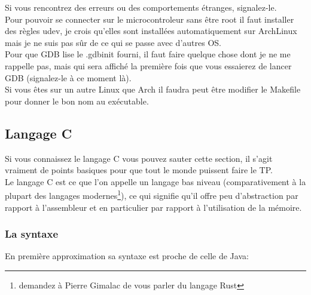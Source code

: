 \documentclass[a4paper,10pt]{article} %
\begin{document}
Si vous rencontrez des erreurs ou des comportements étranges, signalez-le.\\

Pour pouvoir se connecter sur le microcontroleur sans être root il faut installer des règles udev, je crois qu'elles sont installées automatiquement sur ArchLinux mais je ne suis pas sûr de ce qui se passe avec d'autres OS.\\

Pour que GDB lise le .gdbinit fourni, il faut faire quelque chose dont je ne me rappelle pas, mais qui sera affiché la première fois que vous essaierez de lancer GDB (signalez-le à ce moment là).\\

Si vous êtes sur un autre Linux que Arch il faudra peut être modifier le Makefile pour donner le bon nom au exécutable.

\subsection{Langage C}
Si vous connaissez le langage C vous pouvez sauter cette section, il s'agit vraiment de points basiques pour que tout le monde puissent faire le TP.\\

Le langage C est ce que l'on appelle un langage bas niveau (comparativement à la plupart des langages modernes\footnote{demandez à Pierre Gimalac de vous parler du langage Rust}), ce qui signifie qu'il offre peu d'abstraction par rapport à l'assembleur et en particulier par rapport à l'utilisation de la mémoire.\\

\subsubsection{La syntaxe}
En première approximation sa syntaxe est proche de celle de Java:

\newpage
\lstset{language=C,style=customc}
\end{document}
